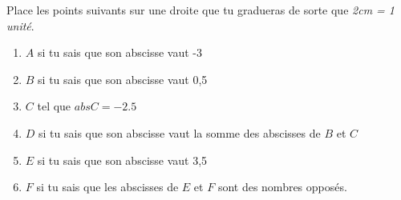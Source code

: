 %
%
    Place les points suivants sur une droite que tu gradueras de sorte que \emph{2cm = 1 unité}.
    \begin{enumerate}[label=\ ]
        \item $A$ si tu sais que son abscisse vaut -3
        \item $B$ si tu sais que son abscisse vaut 0,5
        \item $C$ tel que $abs C = -2.5$
        \item $D$ si tu sais que son abscisse vaut la somme des abscisses de $B$ et $C$
        \item $E$ si tu sais que son abscisse vaut 3,5
        \item $F$ si tu sais que les abscisses de $E$ et $F$ sont des nombres opposés.
    \end{enumerate}
